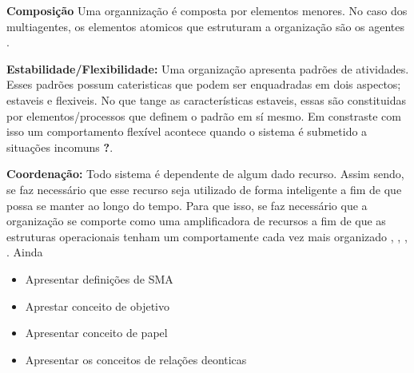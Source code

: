 \textbf{Composição} Uma organnização é composta por elementos menores. No caso dos multiagentes, os elementos atomicos que estruturam a organização são os agentes \cite{organiationofmultiagentsystem}.

\textbf{Estabilidade/Flexibilidade:} Uma organização apresenta padrões de atividades. Esses padrões possum cateristicas que podem ser enquadradas em dois aspectos; estaveis e flexiveis. 
No que tange as características estaveis, essas são constituidas por elementos/processos que definem o padrão em sí mesmo. Em constraste com isso um comportamento flexível acontece quando o 
sistema é submetido a situações incomuns \cite{organiationofmultiagentsystem} \textbf{?}.

\textbf{Coordenação:} Todo sistema é dependente de algum dado recurso. Assim sendo, se faz necessário que esse recurso seja utilizado de forma inteligente a fim de que possa se manter ao longo 
do tempo. Para que isso, se faz necessário que a organização se comporte como uma amplificadora de recursos a fim de que as estruturas operacionais tenham um comportamente cada vez mais organizado 
\cite{selforganization}, \cite{selforganizatioenvoriment}, \cite{defintionselforganization}, \cite{organiationofmultiagentsystem}. Ainda  



\cite{multiagentsystemmodernapproach}
\cite{multiagentsystemwhatis}
\cite{organiationofmultiagentsystem}
\cite{amodelmultiagentsystemdynamicrelationship}
\cite{mosieframework}
\cite{modelingsocialactionforaiagents}
\begin{itemize}
    \item Apresentar definições de SMA
    \item Aprestar conceito de objetivo
    \item Apresentar conceito de papel
    \item Apresentar os conceitos de relações deonticas
\end{itemize}